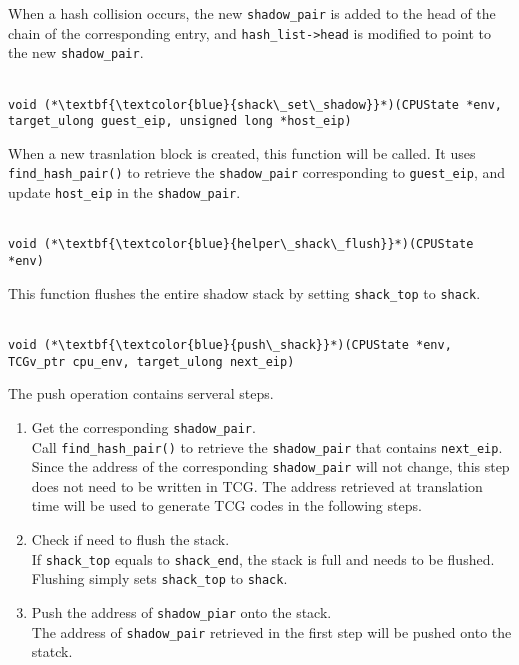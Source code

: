 \documentclass[12pt]{article}
\begin{document}
        When a hash collision occurs, the new \verb|shadow_pair| is added to the head of the chain of the corresponding entry,
        and \verb|hash_list->head| is modified to point to the new \verb|shadow_pair|.
        \\\\
        \begin{lstlisting}[style=Function] 
            void (*\textbf{\textcolor{blue}{shack\_set\_shadow}}*)(CPUState *env, target_ulong guest_eip, unsigned long *host_eip)
        \end{lstlisting}
        When a new trasnlation block is created, this function will be called.
        It uses \verb|find_hash_pair()| to retrieve the \verb|shadow_pair| corresponding to \verb|guest_eip|, 
        and update \verb|host_eip| in the \verb|shadow_pair|.
        \\\\
        \begin{lstlisting}[style=Function] 
            void (*\textbf{\textcolor{blue}{helper\_shack\_flush}}*)(CPUState *env)
        \end{lstlisting}
        This function flushes the entire shadow stack by setting \verb|shack_top| to \verb|shack|.
        \\\\
        \begin{lstlisting}[style=Function] 
            void (*\textbf{\textcolor{blue}{push\_shack}}*)(CPUState *env, TCGv_ptr cpu_env, target_ulong next_eip)
        \end{lstlisting}
        The push operation contains serveral steps.
        \begin{enumerate}
            \item Get the corresponding \verb|shadow_pair|. \\
                Call \verb|find_hash_pair()| to retrieve the \verb|shadow_pair| that contains \verb|next_eip|.
                Since the address of the corresponding \verb|shadow_pair| will not change,
                this step does not need to be written in TCG.
                The address retrieved at translation time will be used to generate TCG codes in the following steps.

            \item Check if need to flush the stack. \\
                If \verb|shack_top| equals to \verb|shack_end|, the stack is full and needs to be flushed.
                Flushing simply sets \verb|shack_top| to \verb|shack|.

            \item Push the address of \verb|shadow_piar| onto the stack. \\
                The address of \verb|shadow_pair| retrieved in the first step will be pushed onto the statck.
        \end{enumerate}
\end{document}
